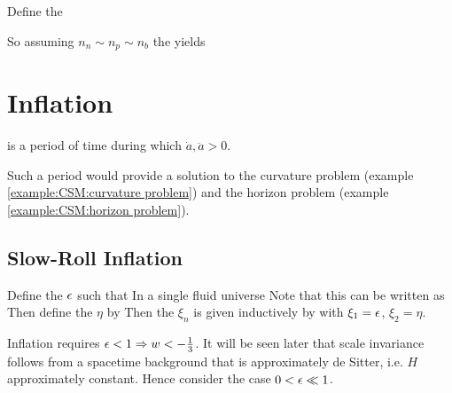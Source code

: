 \documentclass{article}
\begin{document}
\begin{definition}
Define the  
\end{definition}

So assuming $n_n\sim n_p\sim n_b$ the  yields

\section{Inflation}

\begin{definition}[Inflation]
 is a period of time during which $\dot{a},\ddot{a} > 0$. 
\end{definition}

Such a period would provide a solution to the curvature problem (example \ref{example:CSM:curvature problem}) and the horizon problem (example \ref{example:CSM:horizon problem}). 

\subsection{Slow-Roll Inflation}

\begin{definition}
Define the  $\epsilon$ such that 
In a single fluid universe 
Note that this can be written as 
Then define the  $\eta$ by 
Then the  $\xi_n$ is given inductively by 
with $\xi_1 = \epsilon$, $\xi_2 = \eta$. 
\end{definition}

Inflation requires $\epsilon < 1 \Rightarrow w < -\frac{1}{3}$. It will be seen later that scale invariance follows from a spacetime background that is approximately de Sitter, i.e. $H$ approximately constant. Hence consider the case $0< \epsilon \ll 1$. 
\end{document}
